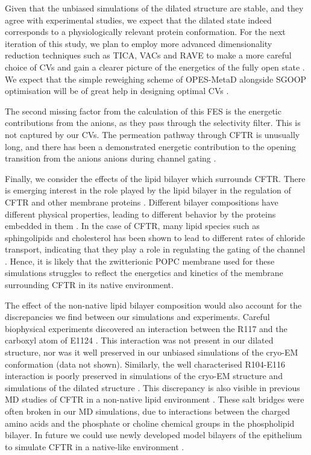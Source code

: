 Given that the unbiased simulations of the dilated structure are stable, and they agree with experimental studies, we expect that the dilated state indeed corresponds to a physiologically relevant protein conformation. For the next iteration of this study, we plan to employ more advanced dimensionality reduction techniques such as TICA, VACs and RAVE to make a more careful choice of CVs and gain a clearer picture of the energetics of the fully open state \cite{brotzakis2019, noe2001, schultze2021, brotzakis2019, ribeiro2018}. We expect that the simple reweighing scheme of OPES-MetaD alongside SGOOP optimisation will be of great help in designing optimal CVs \cite{invernizzi2020, invernizzi2022, smith2018, tiwary2016b}. 

The second missing factor from the calculation of this FES is the energetic contributions from the anions, as they pass through the selectivity filter. This is not captured by our CVs. The permeation pathway through CFTR is unusually long, and there has been a demonstrated energetic contribution to the opening transition from the anions anions during channel gating \cite{gong2004, gong2003, gong2003a, tabcharani1993, zhou2002, sorum2015, yeh2015}. 

Finally, we consider the effects of the lipid bilayer which surrounds CFTR. There is emerging interest in the role played by the lipid bilayer in the regulation of CFTR and other membrane proteins \cite{cottrill2020, lin2022, kapoor2021, farinha2018, cui2020, chin2018}. Different bilayer compositions have different physical properties, leading to different behavior by the proteins embedded in them \cite{hickey2011}. In the case of CFTR, many lipid species such as sphingolipids and cholesterol has been shown to lead to different rates of chloride transport, indicating that they play a role in regulating the gating of the channel \cite{aureli2016, farinha2018, cottrill2020}. Hence, it is likely that the zwitterionic POPC membrane used for these simulations struggles to reflect the energetics and kinetics of the membrane surrounding CFTR in its native environment.

The effect of the non-native lipid bilayer composition would also account for the discrepancies we find between our simulations and experiments. Careful biophysical experiments discovered an interaction between the R117 and the carboxyl atom of E1124 \cite{simon2021}. This interaction was not present in our dilated structure, nor was it well preserved in our unbiased simulations of the cryo-EM conformation (data not shown). Similarly, the well characterised R104-E116 interaction is poorly preserved in simulations of the cryo-EM structure and simulations of the dilated structure \cite{cui2014}. This discrepancy is also visible in previous MD studies of CFTR in a non-native lipid environment \cite{zeng2021}. These salt bridges were often broken in our MD simulations, due to interactions between the charged amino acids and the phosphate or choline chemical groups in the phospholipid bilayer. In future we could use newly developed model bilayers of the epithelium to simulate CFTR in a native-like environment \cite{wilson2021}. 

